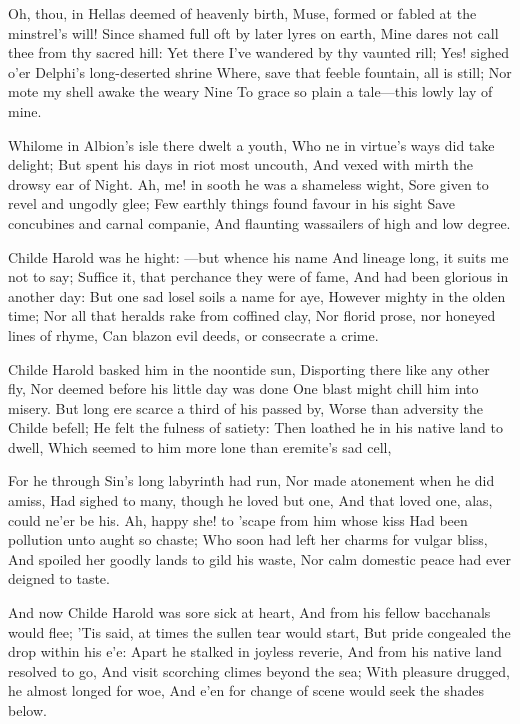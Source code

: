 \documentclass[10pt,twocolumn]{book}
\begin{document}
\Facies \strophae {\stanza}

\canto

   Oh, thou, in Hellas deemed of heavenly birth,
   Muse, formed or fabled at the minstrel's will!
   Since shamed full oft by later lyres on earth,
   Mine dares not call thee from thy sacred hill:
   Yet there I've wandered by thy vaunted rill;
   Yes! sighed o'er Delphi's long-deserted shrine
   Where, save that feeble fountain, all is still;
   Nor mote my shell awake the weary Nine
To grace so plain a tale---this lowly lay of mine.


   Whilome in Albion's isle there dwelt a youth,
   Who ne in virtue's ways did take delight;
   But spent his days in riot most uncouth,
   And vexed with mirth the drowsy ear of Night.
   Ah, me! in sooth he was a shameless wight,
   Sore given to revel and ungodly glee;
   Few earthly things found favour in his sight
   Save concubines and carnal companie,
And flaunting wassailers of high and low degree.

   Childe Harold was he hight: ---but whence his name
   And lineage long, it suits me not to say;
   Suffice it, that perchance they were of fame,
   And had been glorious in another day:
   But one sad losel soils a name for aye,
   However mighty in the olden time;
   Nor all that heralds rake from coffined clay,
   Nor florid prose, nor honeyed lines of rhyme,
Can blazon evil deeds, or consecrate a crime.


   Childe Harold basked him in the noontide sun,
   Disporting there like any other fly,
   Nor deemed before his little day was done
   One blast might chill him into misery.
   But long ere scarce a third of his passed by,
   Worse than adversity the Childe befell;
   He felt the fulness of satiety:
   Then loathed he in his native land to dwell,
Which seemed to him more lone than eremite's sad cell,

   For he through Sin's long labyrinth had run,
   Nor made atonement when he did amiss,
   Had sighed to many, though he loved but one,
   And that loved one, alas, could ne'er be his.
   Ah, happy she! to 'scape from him whose kiss
   Had been pollution unto aught so chaste;
   Who soon had left her charms for vulgar bliss,
   And spoiled her goodly lands to gild his waste,
Nor calm domestic peace had ever deigned to taste.


   And now Childe Harold was sore sick at heart,
   And from his fellow bacchanals would flee;
   'Tis said, at times the sullen tear would start,
   But pride congealed the drop within his e'e:
   Apart he stalked in joyless reverie,
   And from his native land resolved to go,
   And visit scorching climes beyond the sea;
   With pleasure drugged, he almost longed for woe,
And e'en for change of scene would seek the shades below.
\end{document}
